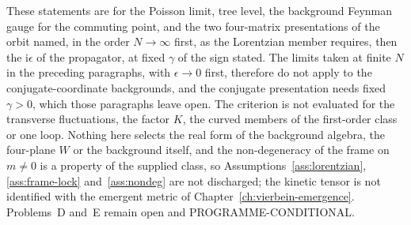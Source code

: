 These statements are for the Poisson limit, tree level, the background Feynman gauge for the commuting point, and the two four-matrix presentations of the orbit named, in the order \(N\to\infty\) first, as the Lorentzian member requires, then the \(\mathrm i\epsilon\) of the propagator, at fixed \(\gamma\) of the sign stated. The limits taken at finite \(N\) in the preceding paragraphs, with \(\epsilon\to0\) first, therefore do not apply to the conjugate-coordinate backgrounds, and the conjugate presentation needs fixed \(\gamma>0\), which those paragraphs leave open. The criterion is not evaluated for the transverse fluctuations, the factor \(K\), the curved members of the first-order class or one loop. Nothing here selects the real form of the background algebra, the four-plane \(W\) or the background itself, and the non-degeneracy of the frame on \(m\neq0\) is a property of the supplied class, so Assumptions~\ref{ass:lorentzian}, \ref{ass:frame-lock} and~\ref{ass:nondeg} are not discharged; the kinetic tensor is not identified with the emergent metric of Chapter~\ref{ch:vierbein-emergence}. Problems~D and~E remain open and PROGRAMME-CONDITIONAL.
